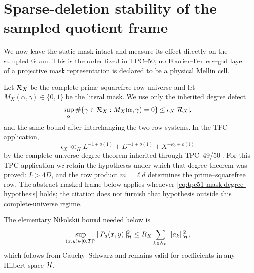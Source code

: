 \section{Sparse-deletion stability of the sampled quotient frame}
\label{sec:tpc51-mask-robustness}

We now leave the static mask intact and measure its effect directly on
the sampled Gram.  This is the order fixed in TPC--50; no
Fourier--Ferrers--gcd layer of a projective mask representation is
declared to be a physical Mellin cell.

Let \(\mathcal R_X\) be the complete prime--squarefree row universe and let
\(M_X(\alpha,\gamma)\in\{0,1\}\) be the literal mask.  We use only the
inherited degree defect
\begin{equation}
 \sup_\alpha\#\{\gamma\in\mathcal R_X:M_X(\alpha,\gamma)=0\}
 \leq\epsilon_X|\mathcal R_X|,
 \label{eq:tpc51-mask-degree-hypothesis}
\end{equation}
and the same bound after interchanging the two row systems.  In the TPC
application,
\begin{equation}
 \epsilon_X\ll_H
 L^{-1+o(1)}+D^{-1+o(1)}+X^{-\kappa_0+o(1)}
 \label{eq:tpc51-inherited-mask-defect}
\end{equation}
by the complete-universe degree theorem inherited through TPC--49/50
\citep{WangTPC49,WangTPC50}.
For this TPC application we retain the hypotheses under which that
degree theorem was proved: \(L>4D\), and the row product
\(m=\ell d\) determines the prime--squarefree row.  The abstract masked
frame below applies whenever \eqref{eq:tpc51-mask-degree-hypothesis}
holds; the citation does not furnish that hypothesis outside this
complete-universe regime.

The elementary Nikolskii bound needed below is
\begin{equation}
 \sup_{(x,y)\in[0,T]^2}\|P_a(x,y)\|_{\mathcal H}^2
 \leq R_K\sum_{k\in\Lambda_K}\|a_k\|_{\mathcal H}^2,
 \label{eq:tpc51-nikolskii}
\end{equation}
which follows from Cauchy--Schwarz and remains valid for coefficients in
any Hilbert space \(\mathcal H\).

